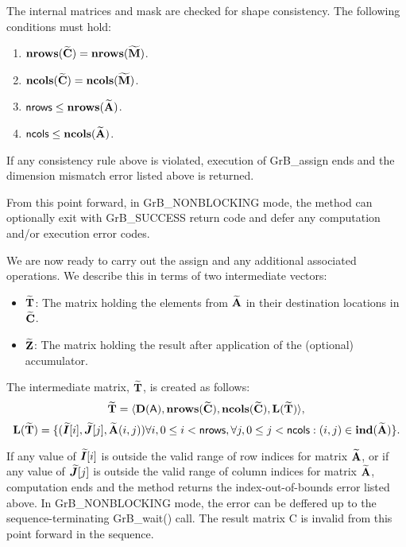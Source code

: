 The internal matrices and mask are checked for shape consistency. The following 
conditions must hold:
\begin{enumerate}
    \item $\bold{nrows}({\bf \widetilde{C}}) = \bold{nrows}({\bf \widetilde{M}})$.
    \item $\bold{ncols}({\bf \widetilde{C}}) = \bold{ncols}({\bf \widetilde{M}})$.
    \item ${\sf nrows} \leq \bold{nrows}({\bf \widetilde{A}})$.
    \item ${\sf ncols} \leq \bold{ncols}({\bf \widetilde{A}})$.
\end{enumerate}
If any consistency rule above is violated, execution of {\sf GrB\_assign} ends and 
the dimension mismatch error listed above is returned.

From this point forward, in {\sf GrB\_NONBLOCKING} mode, the method can optionally exit
with {\sf GrB\_SUCCESS} return code and defer any computation and/or execution error
codes.

We are now ready to carry out the assign and any additional 
associated operations.  We describe this in terms of two intermediate vectors:
\begin{itemize}
	\item ${\bf \widetilde{T}}$: The matrix holding the elements from
		${\bf \widetilde{A}}$ in their destination locations in ${\bf \widetilde{C}}$.
	\item ${\bf \widetilde{Z}}$: The matrix holding the result after 
    application of the (optional) accumulator.
\end{itemize}

The intermediate matrix, ${\bf \widetilde{T}}$, is created as follows:
\[ {\bf \widetilde{T}} = \langle
\bold{D}({\sf A}), \bold{nrows}({\bf \widetilde{C}}), \bold{ncols}({\bf \widetilde{C}}),
\bold{L}({\bf \widetilde{T}}) \rangle, \]
\[
	\bold{L}({\bf \widetilde{T}}) =
\{(\bm{\widetilde{I}}[i],\bm{\widetilde{J}}[j],{\bf \widetilde{A}}(i,j)) \forall i, 0 \leq i < {\sf nrows}, \forall j, 0 \leq j < {\sf ncols} : 
(i,j) \in \bold{ind}({\bf \widetilde{A}}) \}. \]

If any value of $\bm{\widetilde{I}}[i]$ is outside the valid range of row indices
for matrix ${\bf \widetilde{A}}$, or if any value of $\bm{\widetilde{J}}[j]$ is outside the valid range of column indices for matrix ${\bf \widetilde{A}}$,
computation ends and the method returns the
index-out-of-bounds error listed above. In {\sf GrB\_NONBLOCKING} mode, the error
can be deffered up to the sequence-terminating {\sf GrB\_wait()} call.
The result matrix {\sf C} is invalid from this point forward in
the sequence.

